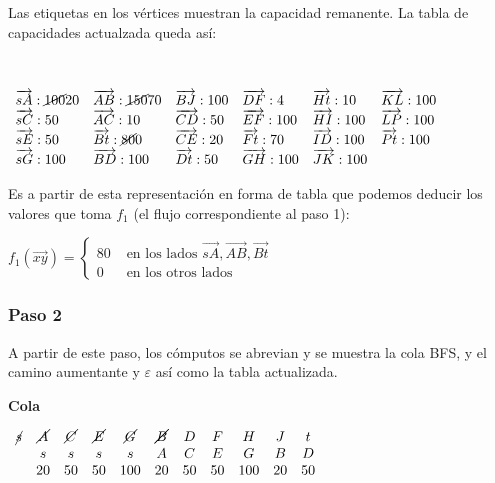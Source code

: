 \documentclass[10pt,a4paper]{article}
\begin{document}
Las etiquetas en los vértices muestran la capacidad remanente. La tabla de capacidades actualzada queda así:

 

\begin{center}
$\begin{array}{llllll} \overrightarrow{sA}: \cancel{100}20& \overrightarrow{AB}: \cancel{150} 70&\overrightarrow{BJ}: 100&\overrightarrow{DF}: 4&\overrightarrow{Ht}: 10&\overrightarrow{KL}: 100\\ \overrightarrow{sC}: 50& \overrightarrow{AC}: 10&\overrightarrow{CD}: 50&\overrightarrow{EF}: 100&\overrightarrow{HI}: 100&\overrightarrow{LP}: 100\\ \overrightarrow{sE}: 50& \overrightarrow{Bt}: \cancel{80} 0&\overrightarrow{CE}: 20&\overrightarrow{Ft}: 70&\overrightarrow{ID}: 100&\overrightarrow{Pt}: 100\\ \overrightarrow{sG}: 100& \overrightarrow{BD}: 100&\overrightarrow{Dt}: 50&\overrightarrow{GH}: 100&\overrightarrow{JK}: 100&\\ \end{array}$
\end{center}

Es a partir de esta representación en forma de tabla que podemos deducir los valores que toma $f_1$ (el flujo correspondiente al paso 1):

\begin{center}
$f_1(\overrightarrow{xy}) = \begin{cases} 80 & \text{ en los lados } \overrightarrow{sA}, \overrightarrow{AB},\overrightarrow{Bt}\\ 0 & \text{ en los otros lados} \end{cases} $
\end{center}

\subsubsection*{Paso 2}

A partir de este paso, los cómputos se abrevian y se muestra la cola BFS, y el camino aumentante y $\varepsilon$ así como la tabla actualizada.

\textbf{Cola}

$\begin{array}{ccccccccccc} \cancel{s} & \cancel{A} & \cancel{C} & \cancel{E} & \cancel{G} & \cancel{B} & D& F& H &J &t\\ & s & s & s & s & A & C & E&G&B &D\\ & 20 & 50 & 50 & 100 & 20 & 50 &50 & 100 & 20 &50 \end{array}$
\end{document}
